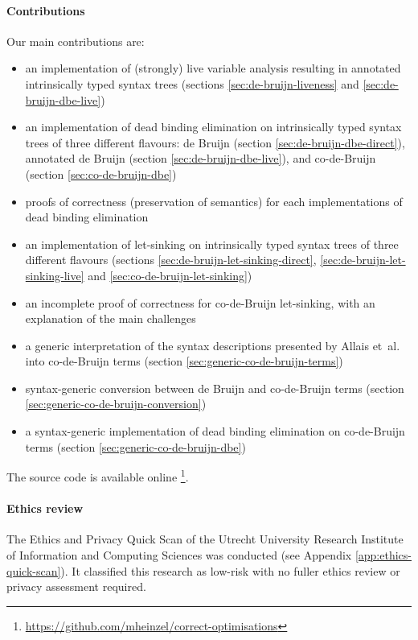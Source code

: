   \paragraph{Contributions}
    Our main contributions are:
    \begin{itemize}
      \item an implementation of (strongly) live variable analysis resulting in annotated intrinsically typed syntax trees
        (sections \ref{sec:de-bruijn-liveness} and \ref{sec:de-bruijn-dbe-live})
      \item an implementation of dead binding elimination on intrinsically typed syntax trees of three different flavours:
        de Bruijn (section \ref{sec:de-bruijn-dbe-direct}),
        annotated de Bruijn (section \ref{sec:de-bruijn-dbe-live}),
        and co-de-Bruijn (section \ref{sec:co-de-bruijn-dbe})
      \item proofs of correctness (preservation of semantics) for each implementations of dead binding elimination
      \item an implementation of let-sinking on intrinsically typed syntax trees of three different flavours
        (sections \ref{sec:de-bruijn-let-sinking-direct}, \ref{sec:de-bruijn-let-sinking-live} and \ref{sec:co-de-bruijn-let-sinking})
      \item an incomplete proof of correctness for co-de-Bruijn let-sinking, with an explanation of the main challenges
      \item a generic interpretation of the syntax descriptions presented by Allais et~al.
        \cite{Allais2018UniverseOfSyntaxes} into co-de-Bruijn terms
        (section \ref{sec:generic-co-de-bruijn-terms})
      \item syntax-generic conversion between de Bruijn and co-de-Bruijn terms
        (section \ref{sec:generic-co-de-bruijn-conversion})
      \item a syntax-generic implementation of dead binding elimination on co-de-Bruijn terms
        (section \ref{sec:generic-co-de-bruijn-dbe})
    \end{itemize}
    The source code is available online%
    \footnote{\url{https://github.com/mheinzel/correct-optimisations}}.

  \paragraph{Ethics review}
    The Ethics and Privacy Quick Scan of the Utrecht University Research Institute of Information and Computing Sciences was conducted (see Appendix \ref{app:ethics-quick-scan}).
    It classified this research as low-risk with no fuller ethics review or privacy assessment required.
